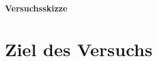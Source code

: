 \documentclass[11pt, A4paper]{article}
\begin{document}
\maketitle
\paragraph{Versuchsskizze}
\newpage
\section{Ziel des Versuchs}
\end{document}
